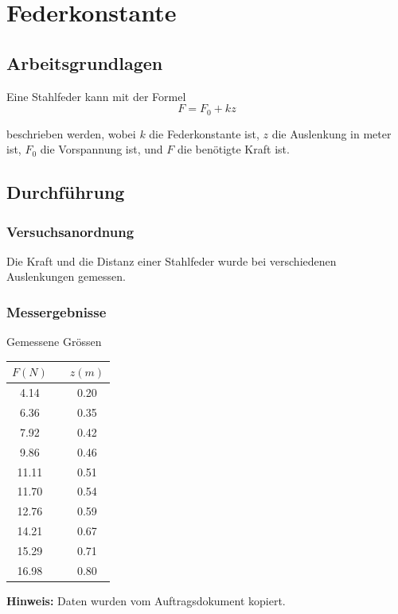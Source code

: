 \section{Federkonstante}

\subsection{Arbeitsgrundlagen}

Eine Stahlfeder kann mit der Formel
\begin{equation}
    F=F_0 + kz
    \label{eq:feder}
\end{equation}

beschrieben werden, wobei $k$ die Federkonstante ist, $z$ die Auslenkung in meter ist, $F_0$ die
Vorspannung ist, und $F$ die ben\"otigte Kraft ist.


\subsection{Durchf\"uhrung}

\subsubsection*{Versuchsanordnung}

Die Kraft und die Distanz einer Stahlfeder wurde bei verschiedenen Auslenkungen gemessen.


\subsubsection*{Messergebnisse}

\begin{center}
    \begin{threeparttable}
        \caption{Gemessene Gr\"ossen}
        \begin{tabular}{ccc}
            \toprule
            $F (N)$ & \hspace{12mm} & $z (m)$ \\
            \midrule
            4.14  & & 0.20 \\
            6.36  & & 0.35 \\
            7.92  & & 0.42 \\
            9.86  & & 0.46 \\
            11.11 & & 0.51 \\
            11.70 & & 0.54 \\
            12.76 & & 0.59 \\
            14.21 & & 0.67 \\
            15.29 & & 0.71 \\
            16.98 & & 0.80 \\
            \bottomrule
        \end{tabular}
        \begin{tablenotes}
            \small
            \item \textbf{Hinweis:} Daten wurden vom Auftragsdokument kopiert.
        \end{tablenotes}
        \label{tab:feder}
    \end{threeparttable}
\end{center}

